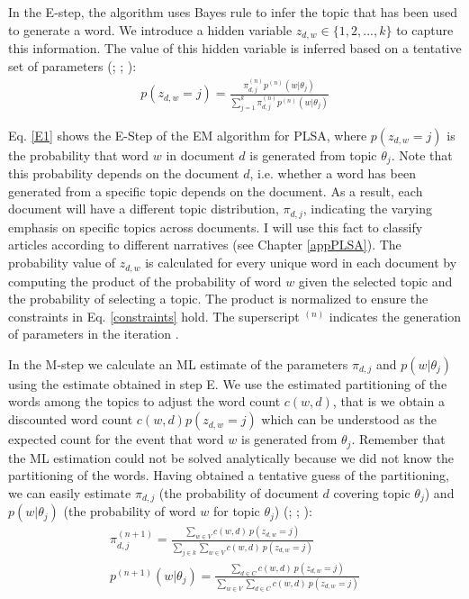 \documentclass[11pt,a4paper,english,oneside]{book}
\numberwithin{equation}{chapter}
\begin{document}
In the E-step, the algorithm uses Bayes rule to infer the topic that has been used to generate a word. We introduce a hidden variable $z_{d,w} \in \{1,2,...,k\}$ to capture this information. The value of this hidden variable is inferred based on a tentative set of parameters (\citealp[p. 290]{Hofmann.1999}; \citeyear[p. 182]{Hofmann.2001}; \citealp[pp. 362--374]{Zhai.2016}):
\begin{align}\label{E1}
p(z_{d,w}=j)=\frac{\pi_{d,j}^{(n)}p^{(n)}(w|\theta_j)}{\sum_{j=1}^{k}\pi_{d,j}^{(n)}p^{(n)}(w|\theta_j)}
\end{align}

Eq. \ref{E1} shows the E-Step of the EM algorithm for PLSA, where $p(z_{d,w}=j)$ is the probability that word $w$ in document $d$ is generated from topic $\theta_j$. Note that this probability depends on the document $d$, i.e. whether a word has been generated from a specific topic depends on the document. As a result, each document will have a different topic distribution, $\pi_{d,j}$, indicating the varying emphasis on specific topics across documents. I will use this fact to classify articles according to different narratives (see Chapter \ref{appPLSA}). The probability value of $z_{d,w}$ is calculated for every unique word in each document by computing the product of the probability of word $w$ given the selected topic and the probability of selecting a topic. The product is normalized to ensure the constraints in Eq. \ref{constraints} hold. The superscript $^{(n)}$ indicates the generation of parameters in the iteration \citep[pp. 374--376]{Zhai.2016}.  

In the M-step we calculate an ML estimate of the parameters $\pi_{d,j}$ and $p(w|\theta_j)$ using the estimate obtained in step E. We use the estimated partitioning of the words among the topics to adjust the word count $c(w,d)$, that is we obtain a discounted word count $c(w,d) p(z_{d,w}=j)$ which can be understood as the expected count for the event that word $w$ is generated from $\theta_j$. Remember that the ML estimation could not be solved analytically because we did not know the partitioning of the words. Having obtained a tentative guess of the partitioning, we can easily estimate $\pi_{d,j}$ (the probability of document $d$ covering topic $\theta_j$) and $p(w|\theta_j)$ (the probability of word $w$ for topic $\theta_j$) (\citealp[p. 290]{Hofmann.1999}; \citeyear[p. 182]{Hofmann.2001}; \citealp[pp. 364--375]{Zhai.2016}):
\begin{align}%
\label{M1pi} \pi_{d,j}^{(n+1)}=\frac{\sum_{w \in V} c(w,d)\ p(z_{d,w}=j)}{\sum_{j \in k}\sum_{w \in V}c(w,d) \ p(z_{d,w}=j)}\\
\label{M1theta} p^{(n+1)}(w|\theta_j)=\frac{\sum_{d \in C} c(w,d)\ p(z_{d,w}=j)}{\sum_{w \in V}\sum_{d \in C}c(w,d)\ p(z_{d,w}=j)}
\end{align}
\end{document}
